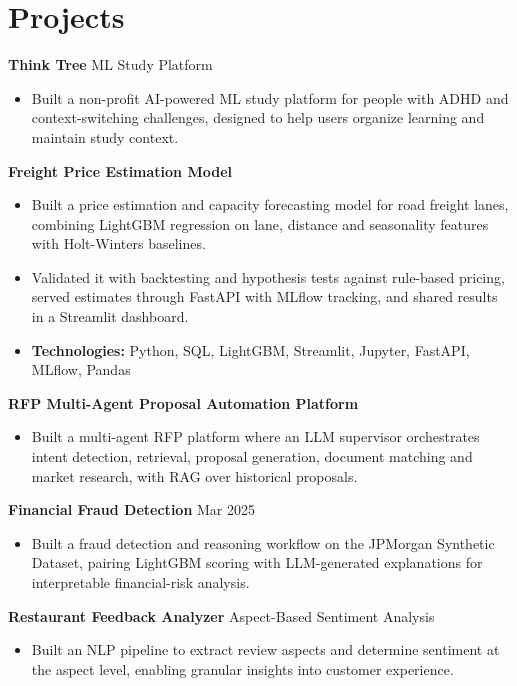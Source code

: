 \documentclass[10pt,a4paper]{article}
\begin{document}
\section{Projects}
\textbf{Think Tree} \textbar{} ML Study Platform\par
\begin{itemize}
  \item Built a non-profit AI-powered ML study platform for people with ADHD and context-switching challenges, designed to help users organize learning and maintain study context.
\end{itemize}
\textbf{Freight Price Estimation Model}\par
\begin{itemize}
  \item Built a price estimation and capacity forecasting model for road freight lanes, combining LightGBM regression on lane, distance and seasonality features with Holt-Winters baselines.
  \item Validated it with backtesting and hypothesis tests against rule-based pricing, served estimates through FastAPI with MLflow tracking, and shared results in a Streamlit dashboard.
  \item \textbf{Technologies:} Python, SQL, LightGBM, Streamlit, Jupyter, FastAPI, MLflow, Pandas
\end{itemize}
\textbf{RFP Multi-Agent Proposal Automation Platform}\par
\begin{itemize}
  \item Built a multi-agent RFP platform where an LLM supervisor orchestrates intent detection, retrieval, proposal generation, document matching and market research, with RAG over historical proposals.
\end{itemize}
\textbf{Financial Fraud Detection} \textbar{} Mar 2025\par
\begin{itemize}
  \item Built a fraud detection and reasoning workflow on the JPMorgan Synthetic Dataset, pairing LightGBM scoring with LLM-generated explanations for interpretable financial-risk analysis.
\end{itemize}
\textbf{Restaurant Feedback Analyzer} \textbar{} Aspect-Based Sentiment Analysis\par
\begin{itemize}
  \item Built an NLP pipeline to extract review aspects and determine sentiment at the aspect level, enabling granular insights into customer experience.
\end{itemize}
\end{document}
